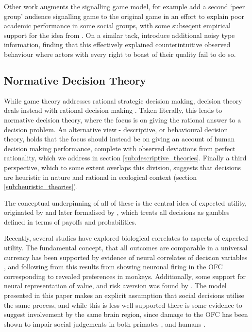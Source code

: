 Other work augments the signalling game model, for example \citet{Austen-Smith2005} add a second `peer group' audience signalling game to the original \citeauthor{Spence1973} game in an effort to explain poor academic performance in some social groups, with some subseqent empirical support for the idea from \citet{Jr2010}. On a similar tack, \citet{Feltovich2002} introduce additional noisy type information, finding that this effectively explained counterintuitive observed behaviour where actors with every right to boast of their quality fail to do so.

\subsection{Normative Decision Theory}

While game theory addresses rational strategic decision making, decision theory deals instead with rational decision making \citep{Peterson2009}.  Taken literally, this leads to normative decision theory, where the focus is on giving the rational answer to a decision problem. An alternative view - descriptive, or behavioural decision theory, holds that the focus should instead be on giving an account of human decision making performance, complete with observed deviations from perfect rationality, which we address in section \ref{sub:descriptive_theories}. Finally a third perspective, which to some extent overlaps this division, suggests that decisions are heuristic in nature and rational in ecological context \citep{Gigerenzer1996} (section \ref{sub:heuristic_theories}).

The conceptual underpinning of all of these is the central idea of expected utility, originated by \citet{Bernoulli1954} and later formalised by \citet{Neumann1953}, which treats all decisions as gambles defined in terms of payoffs and probabilities.

Recently, several studies have explored biological correlates to aspects of expected utility. The fundamental concept, that all outcomes are comparable in a universal currency has been supported by evidence of neural correlates of decision variables \citep{Platt1999}, and following from this results from \citet{Padoa-Schioppa2006,Padoa-Schioppa2008} showing neuronal firing in the \ac{OFC} corresponding to revealed preferences in monkeys. Additionally, some support for neural representation of value, and risk aversion was found by \citet{Christopoulos2009}. The model presented in this paper makes an explicit assumption that social decisions utilise the same process, and while this is less well supported there is some evidence to suggest involvement by the same brain region, since damage to the \ac{OFC} has been shown to impair social judgements in both primates \citep{Watson2012}, and humans \citep{Willis2010}.

